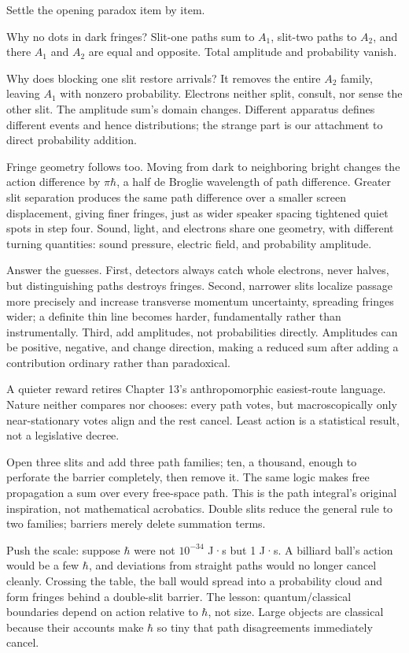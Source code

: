 Settle the opening paradox item by item.

Why no dots in dark fringes? Slit-one paths sum to \(A_1\), slit-two paths to \(A_2\), and there \(A_1\) and \(A_2\) are equal and opposite. Total amplitude and probability vanish.

Why does blocking one slit restore arrivals? It removes the entire \(A_2\) family, leaving \(A_1\) with nonzero probability. Electrons neither split, consult, nor sense the other slit. The amplitude sum's domain changes. Different apparatus defines different events and hence distributions; the strange part is our attachment to direct probability addition.

Fringe geometry follows too. Moving from dark to neighboring bright changes the action difference by \(\pi\hbar\), a half de Broglie wavelength of path difference. Greater slit separation produces the same path difference over a smaller screen displacement, giving finer fringes, just as wider speaker spacing tightened quiet spots in step four. Sound, light, and electrons share one geometry, with different turning quantities: sound pressure, electric field, and probability amplitude.

Answer the guesses. First, detectors always catch whole electrons, never halves, but distinguishing paths destroys fringes. Second, narrower slits localize passage more precisely and increase transverse momentum uncertainty, spreading fringes wider; a definite thin line becomes harder, fundamentally rather than instrumentally. Third, add amplitudes, not probabilities directly. Amplitudes can be positive, negative, and change direction, making a reduced sum after adding a contribution ordinary rather than paradoxical.

A quieter reward retires Chapter 13's anthropomorphic easiest-route language. Nature neither compares nor chooses: every path votes, but macroscopically only near-stationary votes align and the rest cancel. Least action is a statistical result, not a legislative decree.


\begin{thought}
Open three slits and add three path families; ten, a thousand, enough to perforate the barrier completely, then remove it. The same logic makes free propagation a sum over every free-space path. This is the path integral's original inspiration, not mathematical acrobatics. Double slits reduce the general rule to two families; barriers merely delete summation terms.

Push the scale: suppose \(\hbar\) were not \(10^{-34}\) J·s but 1 J·s. A billiard ball's action would be a few \(\hbar\), and deviations from straight paths would no longer cancel cleanly. Crossing the table, the ball would spread into a probability cloud and form fringes behind a double-slit barrier. The lesson: quantum/classical boundaries depend on action relative to \(\hbar\), not size. Large objects are classical because their accounts make \(\hbar\) so tiny that path disagreements immediately cancel.
\end{thought}

